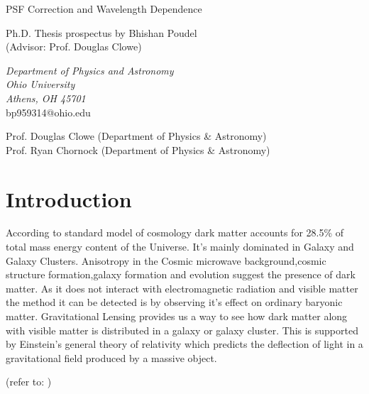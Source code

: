 \documentclass[12pt]{article}
\begin{document}
\thispagestyle{empty}

\begin{center}
	{\fontsize{24pt}{32pt}
		PSF Correction and Wavelength Dependence}
	
	\vspace{3cm}
	
	{%
		\sc
		Ph.D. Thesis prospectus by Bhishan Poudel\\
		(Advisor: Prof. Douglas Clowe)}
	
	\vspace{2cm}
	
	{\it
		Department of Physics and Astronomy\\
		Ohio University\\
		Athens, OH 45701\\}
	\vspace{1cm}
	bp959314@ohio.edu
\end{center}

\vfill
\noindent Prof. Douglas Clowe (Department of Physics \& Astronomy)\\
Prof. Ryan Chornock (Department of Physics \& Astronomy)\\

\newpage
\tableofcontents
\clearpage

\section{Introduction}


According to standard model of cosmology dark matter accounts for  28.5\% of total mass energy content of the Universe.  It's mainly dominated in Galaxy and Galaxy Clusters.  Anisotropy in the Cosmic microwave background,cosmic structure formation,galaxy formation
and evolution suggest the presence of dark matter.  As it does not interact with electromagnetic radiation and visible matter the method it can  be detected is by observing it's effect on ordinary baryonic matter.  Gravitational Lensing provides us a way
to see how dark matter along with visible matter is distributed in a galaxy or galaxy cluster.  This is supported by Einstein's general theory of relativity which predicts the deflection of light in a gravitational field produced by a massive object.

(refer to: \citet{soldner04})

\clearpage

\end{document}
